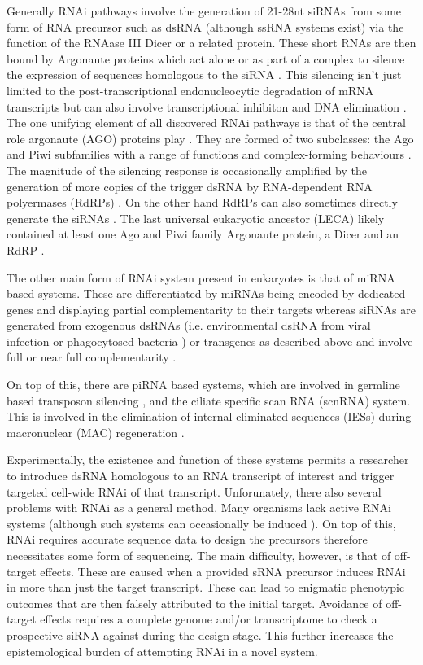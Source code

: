 Generally RNAi pathways involve the generation of 21-28nt siRNAs
from some form of RNA precursor such as dsRNA (although ssRNA systems exist)
via the function of the RNAase III Dicer \citep{Bernstein2001} or a related protein. 
These short RNAs are then bound by Argonaute proteins which act alone or as part
of a complex to silence the expression of sequences homologous to the siRNA \citep{Ketting2011}.
This silencing isn't just limited to the post-transcriptional endonucleocytic degradation of 
mRNA transcripts but can also involve transcriptional inhibiton and
DNA elimination \citep{Marker2014}.
The one unifying element of all discovered RNAi pathways is that
of the central role argonaute (AGO) proteins play \citep{Ketting2011}.
They are formed of two subclasses: the Ago and Piwi subfamilies \citep{Peters2007}
with a range of functions and complex-forming behaviours
\citep{Ender2010}.
The magnitude of the silencing response is occasionally amplified by the generation
of more copies of the trigger dsRNA by RNA-dependent RNA polyermases (RdRPs) \citep{Arp2007}.
On the other hand RdRPs can also sometimes directly generate the siRNAs \citep{Aoki2007,Ketting2011}.
The last universal eukaryotic ancestor (LECA) likely contained 
at least one Ago and Piwi family Argonaute protein, a Dicer and an RdRP \citep{Cerutti2006}.

The other main form of RNAi system present in eukaryotes is that of 
miRNA based systems.  These are differentiated
by miRNAs being encoded by dedicated genes and displaying partial
complementarity to their targets whereas siRNAs are generated from exogenous
dsRNAs (i.e. environmental dsRNA from viral infection or phagocytosed bacteria \citep{Whangbo2008})
or transgenes as described above and involve full or near full complementarity \citep{Shabalina2008}.

On top of this, there are piRNA based systems, which are involved in germline based transposon 
silencing \citep{Iwasaki2015}, and the ciliate specific scan RNA (scnRNA) system.
This is involved in the elimination of internal eliminated sequences (IESs) during
macronuclear (MAC) regeneration \citep{Mochizuki2004,Kiefer2013}.


Experimentally, the existence and function of these systems
permits a researcher to introduce dsRNA homologous to an RNA transcript of interest
and trigger targeted cell-wide RNAi of that transcript.
Unforunately, there also several problems with RNAi as a general method.
Many organisms lack active RNAi systems (although such systems can occasionally
be induced \citep{Alibu2005}).
On top of this, RNAi requires accurate sequence data to design the precursors
therefore necessitates some form of sequencing. 
The main difficulty, however, is that of off-target effects.
These are caused when a provided sRNA precursor induces RNAi
in more than just the target transcript.  These
can lead to enigmatic phenotypic outcomes that 
are then falsely attributed to the initial target.
Avoidance of off-target effects 
requires a complete genome and/or transcriptome
to check a prospective siRNA against during the design
stage.  This further increases the epistemological
burden of attempting RNAi in a novel system.

